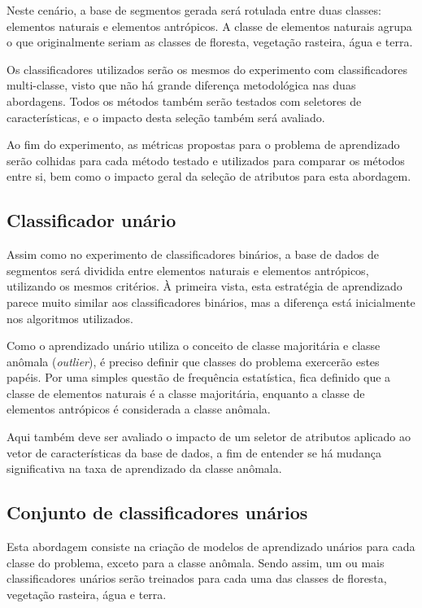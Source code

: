 Neste cenário, a base de segmentos gerada será rotulada entre duas classes: elementos naturais e elementos antrópicos. A classe de elementos naturais agrupa o que originalmente seriam as classes de floresta, vegetação rasteira, água e terra.

Os classificadores utilizados serão os mesmos do experimento com classificadores multi-classe, visto que não há grande diferença metodológica nas duas abordagens. Todos os métodos também serão testados com seletores de características, e o impacto desta seleção também será avaliado.

Ao fim do experimento, as métricas propostas para o problema de aprendizado serão colhidas para cada método testado e utilizados para comparar os métodos entre si, bem como o impacto geral da seleção de atributos para esta abordagem.

\subsection{Classificador unário}

Assim como no experimento de classificadores binários, a base de dados de segmentos será dividida entre elementos naturais e elementos antrópicos, utilizando os mesmos critérios. À primeira vista, esta estratégia de aprendizado parece muito similar aos classificadores binários, mas a diferença está inicialmente nos algoritmos utilizados.

Como o aprendizado unário utiliza o conceito de classe majoritária e classe anômala (\textit{outlier}), é preciso definir que classes do problema exercerão estes papéis. Por uma simples questão de frequência estatística, fica definido que a classe de elementos naturais é a classe majoritária, enquanto a classe de elementos antrópicos é considerada a classe anômala.

Aqui também deve ser avaliado o impacto de um seletor de atributos aplicado ao vetor de características da base de dados, a fim de entender se há mudança significativa na taxa de aprendizado da classe anômala.

\subsection{Conjunto de classificadores unários}

Esta abordagem consiste na criação de modelos de aprendizado unários para cada classe do problema, exceto para a classe anômala. Sendo assim, um ou mais classificadores unários serão treinados para cada uma das classes de floresta, vegetação rasteira, água e terra.

